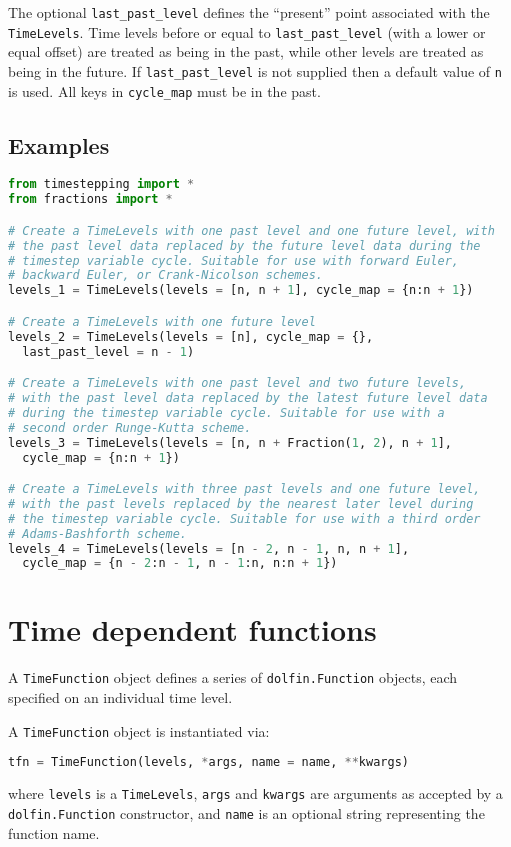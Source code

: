 \documentclass[a4paper]{book}
\begin{document}
The optional \verb+last_past_level+ defines the ``present'' point associated
with the \verb+TimeLevels+. Time levels before or equal to
\verb+last_past_level+ (with a lower or equal offset) are treated as being in
the past, while other levels are treated as being in the future. If
\verb+last_past_level+ is not supplied then a default value of \verb+n+ is used.
All keys in \verb+cycle_map+ must be in the past.

\subsection*{Examples}

\begin{lstlisting}[language = python, frame = single, basicstyle=\footnotesize]
from timestepping import *
from fractions import *

# Create a TimeLevels with one past level and one future level, with
# the past level data replaced by the future level data during the
# timestep variable cycle. Suitable for use with forward Euler,
# backward Euler, or Crank-Nicolson schemes.
levels_1 = TimeLevels(levels = [n, n + 1], cycle_map = {n:n + 1})

# Create a TimeLevels with one future level
levels_2 = TimeLevels(levels = [n], cycle_map = {},
  last_past_level = n - 1)

# Create a TimeLevels with one past level and two future levels,
# with the past level data replaced by the latest future level data
# during the timestep variable cycle. Suitable for use with a
# second order Runge-Kutta scheme.
levels_3 = TimeLevels(levels = [n, n + Fraction(1, 2), n + 1],
  cycle_map = {n:n + 1})

# Create a TimeLevels with three past levels and one future level,
# with the past levels replaced by the nearest later level during
# the timestep variable cycle. Suitable for use with a third order
# Adams-Bashforth scheme.
levels_4 = TimeLevels(levels = [n - 2, n - 1, n, n + 1],
  cycle_map = {n - 2:n - 1, n - 1:n, n:n + 1})
\end{lstlisting}

\section{Time dependent functions}

A \verb+TimeFunction+ object defines a series of \verb+dolfin.Function+ objects,
each specified on an individual time level.

A \verb+TimeFunction+ object is instantiated via:
\begin{lstlisting}[language = python, frame = single, basicstyle=\footnotesize]
tfn = TimeFunction(levels, *args, name = name, **kwargs)
\end{lstlisting}
where \verb+levels+ is a \verb+TimeLevels+, \verb+args+ and \verb+kwargs+ are
arguments as accepted by a \verb+dolfin.Function+ constructor, and \verb+name+
is an optional string representing the function name.
\end{document}
